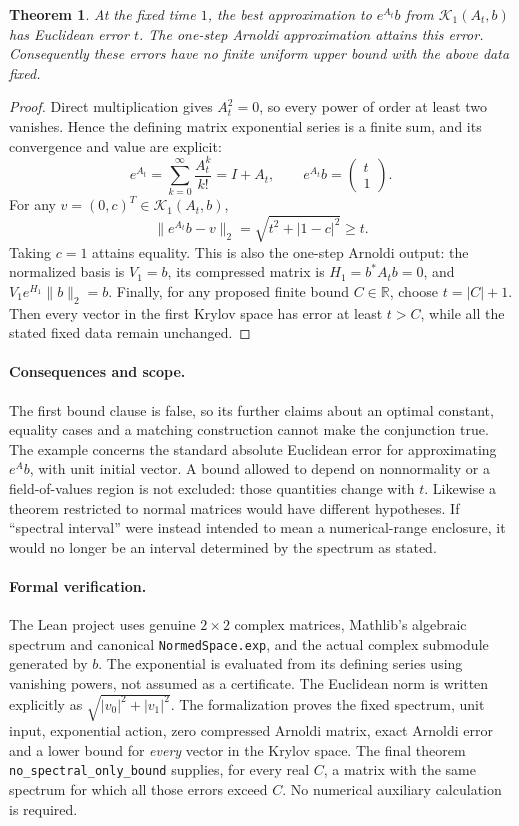 \documentclass[11pt]{article}
\newtheorem{theorem}{Theorem}
\begin{document}
\begin{theorem}
At the fixed time $1$, the best approximation to $e^{A_t}b$ from
$\mathcal K_1(A_t,b)$ has Euclidean error $t$. The one-step Arnoldi
approximation attains this error. Consequently these errors have no
finite uniform upper bound with the above data fixed.
\end{theorem}
\begin{proof}
Direct multiplication gives $A_t^2=0$, so every power of order at least
two vanishes. Hence the defining matrix exponential series is a finite
sum, and its convergence and value are explicit:
\[
 e^{A_t}=\sum_{k=0}^{\infty}\frac{A_t^k}{k!}=I+A_t,
       \qquad e^{A_t}b=\begin{pmatrix}t\\1\end{pmatrix}.
\]
For any $v=(0,c)^T\in\mathcal K_1(A_t,b)$,
\[
 \|e^{A_t}b-v\|_2
   =\sqrt{t^2+|1-c|^2}\geq t.
\]
Taking $c=1$ attains equality. This is also the one-step Arnoldi output:
the normalized basis is $V_1=b$, its compressed matrix is
$H_1=b^*A_tb=0$, and $V_1e^{H_1}\|b\|_2=b$.
Finally, for any proposed finite bound $C\in\mathbb R$, choose
$t=|C|+1$. Then every vector in the first Krylov space has error at least
$t>C$, while all the stated fixed data remain unchanged.
\end{proof}

\paragraph{Consequences and scope.}
The first bound clause is false, so its further claims about an optimal
constant, equality cases and a matching construction cannot make the
conjunction true. The example concerns the standard absolute Euclidean
error for approximating $e^A b$, with unit initial vector. A bound allowed
to depend on nonnormality or a field-of-values region is not excluded:
those quantities change with $t$. Likewise a theorem restricted to normal
matrices would have different hypotheses. If ``spectral interval'' were
instead intended to mean a numerical-range enclosure, it would no longer
be an interval determined by the spectrum as stated.

\paragraph{Formal verification.}
The Lean project uses genuine $2\times2$ complex matrices, Mathlib's
algebraic spectrum and canonical \texttt{NormedSpace.exp}, and the
actual complex submodule generated by $b$. The exponential is evaluated
from its defining series using vanishing powers, not assumed as a
certificate. The Euclidean norm is written explicitly as
$\sqrt{|v_0|^2+|v_1|^2}$. The formalization proves the fixed spectrum,
unit input, exponential action, zero compressed Arnoldi matrix, exact
Arnoldi error and a lower bound for \emph{every} vector in the Krylov
space. The final theorem \texttt{no\_spectral\_only\_bound} supplies, for
every real $C$, a matrix with the same spectrum for which all those errors
exceed $C$. No numerical auxiliary calculation is required.
\end{document}
